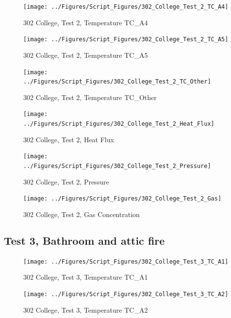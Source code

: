 \documentclass[12pt,oneside]{book}
\begin{document}
\begin{figure}[!ht]
\texttt{[image: ../Figures/Script\_Figures/302\_College\_Test\_2\_TC\_A4]}
\caption{302 College, Test 2, Temperature TC\_A4}
\label{fig:302_College_Test_2_TC_A4}
\end{figure}

\begin{figure}[!ht]
\texttt{[image: ../Figures/Script\_Figures/302\_College\_Test\_2\_TC\_A5]}
\caption{302 College, Test 2, Temperature TC\_A5}
\label{fig:302_College_Test_2_TC_A5}
\end{figure}

\begin{figure}[!ht]
\texttt{[image: ../Figures/Script\_Figures/302\_College\_Test\_2\_TC\_Other]}
\caption{302 College, Test 2, Temperature TC\_Other}
\label{fig:302_College_Test_2_TC_Other}
\end{figure}

\begin{figure}[!ht]
\texttt{[image: ../Figures/Script\_Figures/302\_College\_Test\_2\_Heat\_Flux]}
\caption{302 College, Test 2, Heat Flux}
\label{fig:302_College_Test_2_Heat_Flux}
\end{figure}

\begin{figure}[!ht]
\texttt{[image: ../Figures/Script\_Figures/302\_College\_Test\_2\_Pressure]}
\caption{302 College, Test 2, Pressure}
\label{fig:302_College_Test_2_Pressure}
\end{figure}

\begin{figure}[!ht]
\texttt{[image: ../Figures/Script\_Figures/302\_College\_Test\_2\_Gas]}
\caption{302 College, Test 2, Gas Concentration}
\label{fig:302_College_Test_2_Gas}
\end{figure}


\clearpage


\subsection{Test 3, Bathroom and attic fire}

\begin{figure}[!ht]
\texttt{[image: ../Figures/Script\_Figures/302\_College\_Test\_3\_TC\_A1]}
\caption{302 College, Test 3, Temperature TC\_A1}
\label{fig:302_College_Test_3_TC_A1}
\end{figure}

\begin{figure}[!ht]
\texttt{[image: ../Figures/Script\_Figures/302\_College\_Test\_3\_TC\_A2]}
\caption{302 College, Test 3, Temperature TC\_A2}
\label{fig:302_College_Test_3_TC_A2}
\end{figure}
\end{document}
